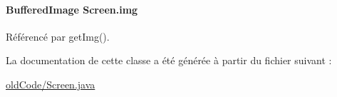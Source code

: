 \paragraph[{img}]{\setlength{\rightskip}{0pt plus 5cm}Buffered\+Image Screen.\+img\hspace{0.3cm}{\ttfamily [private]}}\label{classScreen_af49ad57043e65d732b53075fcfc7584c}


Référencé par get\+Img().



La documentation de cette classe a été générée à partir du fichier suivant \+:\begin{DoxyCompactItemize}
\item 
\hyperlink{oldCode_2Screen_8java}{old\+Code/\+Screen.\+java}\end{DoxyCompactItemize}
